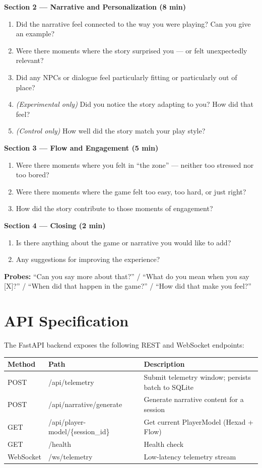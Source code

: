 \textbf{Section 2 --- Narrative and Personalization (8 min)}
\begin{enumerate}[resume]
\item Did the narrative feel connected to the way you were playing? Can you give an example?
\item Were there moments where the story surprised you --- or felt unexpectedly relevant?
\item Did any NPCs or dialogue feel particularly fitting or particularly out of place?
\item \textit{(Experimental only)} Did you notice the story adapting to you? How did that feel?
\item \textit{(Control only)} How well did the story match your play style?
\end{enumerate}

\textbf{Section 3 --- Flow and Engagement (5 min)}
\begin{enumerate}[resume]
\item Were there moments where you felt in ``the zone'' --- neither too stressed nor too bored?
\item Were there moments where the game felt too easy, too hard, or just right?
\item How did the story contribute to those moments of engagement?
\end{enumerate}

\textbf{Section 4 --- Closing (2 min)}
\begin{enumerate}[resume]
\item Is there anything about the game or narrative you would like to add?
\item Any suggestions for improving the experience?
\end{enumerate}

\textbf{Probes:} ``Can you say more about that?'' / ``What do you mean when you say [X]?'' / ``When did that happen in the game?'' / ``How did that make you feel?''


\chapter{API Specification}
\label{app:api}

The FastAPI backend exposes the following REST and WebSocket endpoints:

\begin{table}[H]
\centering
\small
\begin{tabular}{@{}llp{6cm}@{}}
\toprule
\textbf{Method} & \textbf{Path} & \textbf{Description} \\
\midrule
POST & /api/telemetry & Submit telemetry window; persists batch to SQLite \\
POST & /api/narrative/generate & Generate narrative content for a session \\
GET & /api/player-model/\{session\_id\} & Get current PlayerModel (Hexad + Flow) \\
GET & /health & Health check \\
WebSocket & /ws/telemetry & Low-latency telemetry stream \\
\bottomrule
\end{tabular}
\end{table}

